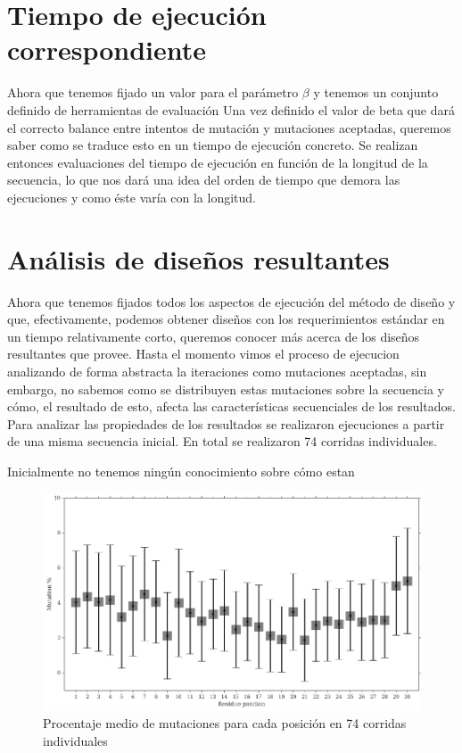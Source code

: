 \section{Tiempo de ejecución correspondiente}

Ahora que tenemos fijado un valor para el parámetro $\beta$ y tenemos un conjunto definido de herramientas de evaluación
Una vez definido el valor de beta que dará el correcto balance entre intentos de mutación y mutaciones aceptadas, queremos saber como se traduce esto en un tiempo de ejecución concreto.
Se realizan entonces evaluaciones del tiempo de ejecución en función de la longitud de la secuencia, lo que nos dará una idea del orden de tiempo que demora las ejecuciones y como éste varía con la longitud.






\section{Análisis de diseños resultantes}


Ahora que tenemos fijados todos los aspectos de ejecución del método de diseño y que, efectivamente, podemos obtener diseños con los requerimientos estándar en un tiempo relativamente corto, 
queremos conocer más acerca de los diseños resultantes que provee.  
Hasta el momento vimos el proceso de ejecucion analizando de forma abstracta la iteraciones como mutaciones aceptadas, sin embargo, no sabemos como se distribuyen estas mutaciones sobre la secuencia y cómo, el resultado de esto, 
afecta las características secuenciales de los resultados.
Para analizar las propiedades de los resultados se realizaron ejecuciones a partir de una misma secuencia inicial.  
En total se realizaron 74 corridas individuales.

Inicialmente no tenemos ningún conocimiento sobre cómo estan 

\begin{figure}[htbp]
\includegraphics[width=\textwidth]{img/resultados/mutationsPerPosition.png}
\caption{Procentaje medio de mutaciones para cada posición en 74 corridas individuales}
\label{fig:mutationPerSite}
\end{figure}

